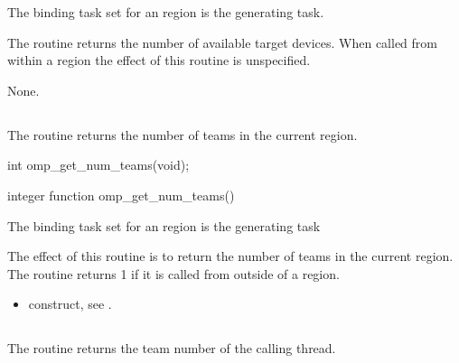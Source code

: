 \binding
The binding task set for an  region is the generating task.

\effect
The  routine returns the number of available target devices. 
When called from within a  region the effect of this routine is unspecified.

\crossreferences
None.










\subsection{}
\label{subsec:omp_get_num_teams}
\summary
The  routine returns the number of teams in the current  
region.

\pagebreak
\format
\ccppspecificstart
\begin{boxedcode}
int omp\_get\_num\_teams(void);
\end{boxedcode}
\ccppspecificend

\fortranspecificstart
\begin{boxedcode}
integer function omp\_get\_num\_teams()
\end{boxedcode}
\fortranspecificend

\binding
The binding task set for an  region is the generating task

\effect
The effect of this routine is to return the number of teams in the current  region. 
The routine returns 1 if it is called from outside of a  region.

\crossreferences
\begin{itemize}
\item {} construct, see 
. 
\end{itemize}










\pagebreak
\subsection{}
\label{subsec:omp_get_team_num}
\summary
The  routine returns the team number of the calling thread.

